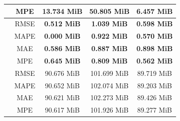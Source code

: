 \begin{table}[!htp]
\begin{tabular}{|c|c|ccc|}
        \rowcolor[HTML]{EFEFEF}
        \multirow{-4}{*}{\cellcolor[HTML]{C0C0C0}ARIMA}   & MPE                                               & \multicolumn{1}{c|}{\cellcolor[HTML]{EFEFEF}13.734 MiB}         & \multicolumn{1}{c|}{\cellcolor[HTML]{EFEFEF}50.805 MiB}         & 6.457 MiB          \\ \hline
        \cellcolor[HTML]{C0C0C0}                          & RMSE                                              & \multicolumn{1}{c|}{\textbf{0.512 MiB}}                         & \multicolumn{1}{c|}{\textbf{1.039 MiB}}                         & \textbf{0.598 MiB} \\ \cline{2-5}
        \rowcolor[HTML]{EFEFEF}
        \cellcolor[HTML]{C0C0C0}                          & MAPE                                              & \multicolumn{1}{c|}{\cellcolor[HTML]{EFEFEF}\textbf{0.000 MiB}} & \multicolumn{1}{c|}{\cellcolor[HTML]{EFEFEF}\textbf{0.922 MiB}} & \textbf{0.570 MiB} \\ \cline{2-5}
        \cellcolor[HTML]{C0C0C0}                          & MAE                                               & \multicolumn{1}{c|}{\textbf{0.586 MiB}}                         & \multicolumn{1}{c|}{\textbf{0.887 MiB}}                         & \textbf{0.898 MiB} \\ \cline{2-5}
        \rowcolor[HTML]{EFEFEF}
        \multirow{-4}{*}{\cellcolor[HTML]{C0C0C0}ReW}     & MPE                                               & \multicolumn{1}{c|}{\cellcolor[HTML]{EFEFEF}\textbf{0.645 MiB}} & \multicolumn{1}{c|}{\cellcolor[HTML]{EFEFEF}\textbf{0.809 MiB}} & \textbf{0.562 MiB} \\ \hline
        \cellcolor[HTML]{C0C0C0}                          & RMSE                                              & \multicolumn{1}{c|}{90.676 MiB}                                 & \multicolumn{1}{c|}{101.699 MiB}                                & 89.719 MiB         \\ \cline{2-5}
        \rowcolor[HTML]{EFEFEF}
        \cellcolor[HTML]{C0C0C0}                          & MAPE                                              & \multicolumn{1}{c|}{\cellcolor[HTML]{EFEFEF}90.652 MiB}         & \multicolumn{1}{c|}{\cellcolor[HTML]{EFEFEF}102.074 MiB}        & 89.203 MiB         \\ \cline{2-5}
        \cellcolor[HTML]{C0C0C0}                          & MAE                                               & \multicolumn{1}{c|}{90.621 MiB}                                 & \multicolumn{1}{c|}{102.273 MiB}                                & 89.426 MiB         \\ \cline{2-5}
        \rowcolor[HTML]{EFEFEF}
        \multirow{-4}{*}{\cellcolor[HTML]{C0C0C0}Prophet} & MPE                                               & \multicolumn{1}{c|}{\cellcolor[HTML]{EFEFEF}90.617 MiB}         & \multicolumn{1}{c|}{\cellcolor[HTML]{EFEFEF}101.926 MiB}        & 89.277 MiB         \\ \hline
    \end{tabular}
\end{table}

